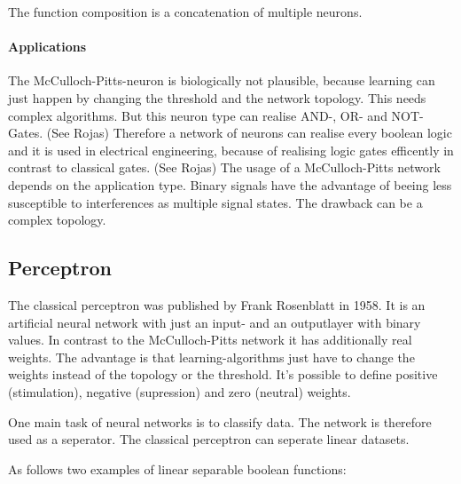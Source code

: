 \documentclass[10pt,a4paper,DIV=11]{scrreprt}
\begin{document}
The function composition is a concatenation of multiple neurons. \\

\paragraph*{Applications}
The McCulloch-Pitts-neuron is biologically not plausible, because learning
can just happen by changing the threshold and the network topology. This needs complex algorithms.
But this neuron type can realise AND-, OR- and NOT-Gates. (See Rojas)
Therefore a network of neurons can realise every boolean logic and it is used in electrical engineering, because of realising logic gates efficently in contrast to classical gates. (See Rojas)
The usage of a McCulloch-Pitts network depends on the application type. Binary signals have the advantage of beeing less susceptible to interferences as multiple signal states.
The drawback can be a complex topology.

\subsection{Perceptron}
The classical perceptron was published by Frank Rosenblatt in 1958\cite{ros}.
It is an artificial neural network with just an input- and an outputlayer with binary values. In contrast to the McCulloch-Pitts network it has additionally real weights. The advantage is that learning-algorithms just have to change the weights instead of the topology or the threshold. It's possible to define positive (stimulation), negative (supression) and zero (neutral) weights.

One main task of neural networks is to classify data. The network is therefore used as a seperator.
The classical perceptron can seperate linear datasets. 

As follows two examples of linear separable boolean functions:
\end{document}
